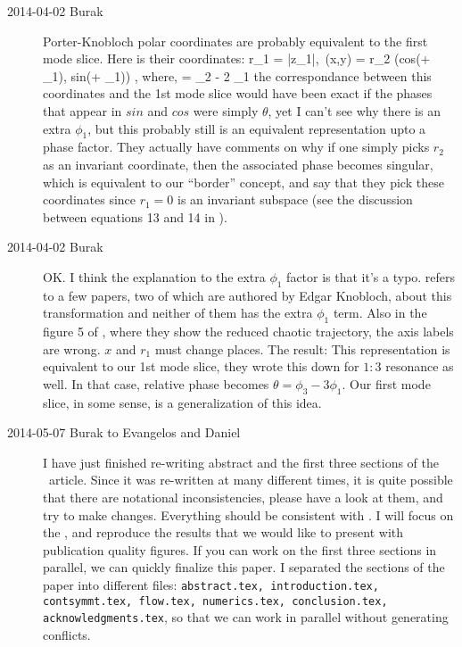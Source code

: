 \begin{description}
\item[2014-04-02 Burak] Porter-Knobloch polar coordinates are probably
equivalent to the first mode slice. Here is their coordinates:
\beq
	r_1 = |z_1|,\, (x,y) = r_2 (cos(\theta + \phi_1), sin(\theta + \phi_1))
	, \mbox{where}, \theta = \phi_2 - 2 \phi_1
\eeq
the correspondance between this coordinates and the 1st mode slice would
have been exact if the phases that appear in $sin$ and $cos$ were simply
$\theta$, yet I can't see why there is an extra $\phi_1$, but this probably
still is an equivalent representation upto a phase factor. They actually
have comments on why if one simply picks $r_2$ as an invariant coordinate,
then the associated phase becomes singular, which is equivalent to our
``border'' concept, and say that they pick these coordinates since $r_1=0$
is an invariant subspace (see the discussion between equations 13 and 14 in
).

\item[2014-04-02 Burak] OK. I think the explanation to the extra $\phi_1$
factor is that it's a typo.  refers to a few papers, two
of which are authored by Edgar Knobloch, about this transformation and neither
of them  has the extra $\phi_1$ term. Also in the figure 5 of ,
where they show the reduced chaotic trajectory, the axis labels are wrong.
$x$ and $r_1$ must change places. The result: This representation is equivalent
to our 1st mode slice, they wrote this down for $1:3$ resonance as well.
In that case, relative phase becomes $\theta = \phi_3 - 3 \phi_1$. Our first
mode slice, in some sense, is a generalization of this idea.

\item[2014-05-07 Burak to Evangelos and Daniel] I have just finished re-writing
abstract and the first three sections of the \twomode\ article. Since it
was re-written at many different times, it is quite possible that there are
notational inconsistencies, please have a look at them, and try to make
changes. Everything should be consistent with .
{I will focus on the , and reproduce
the results that we would like to present with publication quality figures. }
If you can work on the first three sections in parallel, we can quickly
finalize this paper. I separated the sections of the paper into different
files: \texttt{abstract.tex, introduction.tex, contsymmt.tex, flow.tex,
numerics.tex, conclusion.tex, acknowledgments.tex}, so that we
can work in parallel without generating conflicts.


\end{description}
